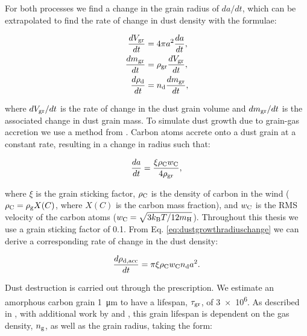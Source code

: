 For both processes we find a change in the grain radius of $da/dt$, which can be extrapolated to find the rate of change in dust density with the formulae:

\begin{subequations}
  \begin{align}
    \frac{dV_\text{gr}}{dt} & = 4 \pi a^2 \frac{da}{dt} ,\\
    \frac{dm_\text{gr}}{dt} & = \rho_\text{gr} \frac{dV_\text{gr}}{dt} ,\\
    \frac{d\rho_\text{d}}{dt}   & = n_\text{d} \frac{dm_\text{gr}}{dt} ,
  \end{align}
\end{subequations}

\noindent
where $dV_\text{gr}/dt$ is the rate of change in the dust grain volume and $dm_\text{gr}/dt$ is the associated change in dust grain mass.
To simulate dust growth due to grain-gas accretion we use a method from \textcite[Ch.~9]{spitzerPhysicalProcessesInterstellar2008}.
Carbon atoms accrete onto a dust grain at a constant rate, resulting in a change in radius such that:

\begin{equation}
  \label{eq:dustgrowthradiuschange}
  \frac{da}{dt} = \frac{\xi \rho_\text{C} w_\text{C}}{4\rho_\text{gr}} ,
\end{equation}

\noindent
where $\xi$ is the grain sticking factor, $\rho_\text{C}$ is the density of carbon in the wind ($\rho_\text{C} = \rho_\text{g} X(C)$, where $X(C)$ is the carbon mass fraction), and $w_\text{C}$ is the RMS velocity of the carbon atoms ($w_\text{C} = \sqrt{3k_\text{B}T / 12 m_\text{H}}$).
Throughout this thesis we use a grain sticking factor of 0.1.
From Eq. \ref{eq:dustgrowthradiuschange} we can derive a corresponding rate of change in the dust density:

\begin{equation}
  \frac{d \rho_\text{d,acc}}{dt} = \pi \xi \rho_\text{C} w_\text{C} n_\text{d} a^2.
\end{equation}

\noindent
Dust destruction is carried out through the \textcite{draineDestructionMechanismsInterstellar1979} prescription.
We estimate an amorphous carbon grain \SI{1}{\micro\metre} to have a lifespan, $\tau_\text{gr}$, of \SI{3e6}{\year}.
As described in \textcite{draineDestructionMechanismsInterstellar1979}, with additional work by \textcite{tielens_physics_1994} and \textcite{dwekCoolingSputteringInfrared1996}, this grain lifespan is dependent on the gas density, $n_\text{g}$, as well as the grain radius, taking the form:

